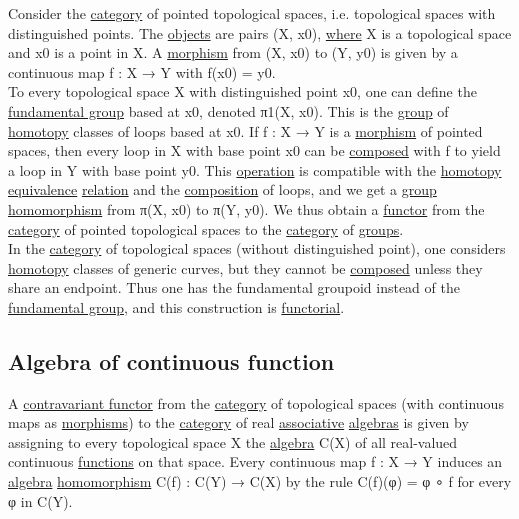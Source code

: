 \documentclass[11pt]{article}
\begin{document}
Consider the \hyperref[org3e3a79b]{category} of pointed topological spaces, i.e. topological spaces with distinguished points. The \hyperref[orge0f000f]{objects} are pairs (X, x0), \hyperref[orgefd1ecd]{where} X is a topological space and x0 is a point in X. A \hyperref[orgad99fc6]{morphism} from (X, x0) to (Y, y0) is given by a continuous map f : X → Y with f(x0) = y0.\\

To every topological space X with distinguished point x0, one can define the \hyperref[org0b73b5f]{fundamental group} based at x0, denoted π1(X, x0). This is the \hyperref[org9ef38ed]{group} of \hyperref[orgc7221e4]{homotopy} classes of loops based at x0. If f : X → Y is a \hyperref[orgad99fc6]{morphism} of pointed spaces, then every loop in X with base point x0 can be \hyperref[orgb941f76]{composed} with f to yield a loop in Y with base point y0. This \hyperref[org87d485b]{operation} is compatible with the \hyperref[orgc7221e4]{homotopy} \hyperref[orgad1fc87]{equivalence} \hyperref[org6e8ae46]{relation} and the \hyperref[org24a8abd]{composition} of loops, and we get a \hyperref[org9ef38ed]{group} \hyperref[org01da5b8]{homomorphism} from π(X, x0) to π(Y, y0). We thus obtain a \hyperref[org6073683]{functor} from the \hyperref[org3e3a79b]{category} of pointed topological spaces to the \hyperref[org3e3a79b]{category} of \hyperref[org7292335]{groups}.\\

In the \hyperref[org3e3a79b]{category} of topological spaces (without distinguished point), one considers \hyperref[orgc7221e4]{homotopy} classes of generic curves, but they cannot be \hyperref[orgb941f76]{composed} unless they share an endpoint. Thus one has the fundamental groupoid instead of the \hyperref[org0b73b5f]{fundamental group}, and this construction is \hyperref[org8ac5764]{functorial}.\\

\subsection{\label{org3d444dc}Algebra of continuous function}
\label{sec:org6b48d3b}

A \hyperref[org4f18281]{contravariant functor} from the \hyperref[org3e3a79b]{category} of topological spaces (with continuous maps as \hyperref[org8ed0ce8]{morphisms}) to the \hyperref[org3e3a79b]{category} of real \hyperref[org31bffbb]{associative} \hyperref[org238196c]{algebras} is given by assigning to every topological space X the \hyperref[orgecde2fc]{algebra} C(X) of all real-valued continuous \hyperref[org66c5288]{functions} on that space. Every continuous map f : X → Y induces an \hyperref[orgecde2fc]{algebra} \hyperref[org01da5b8]{homomorphism} C(f) : C(Y) → C(X) by the rule C(f)(φ) = φ ∘ f for every φ in C(Y).\\
\end{document}

